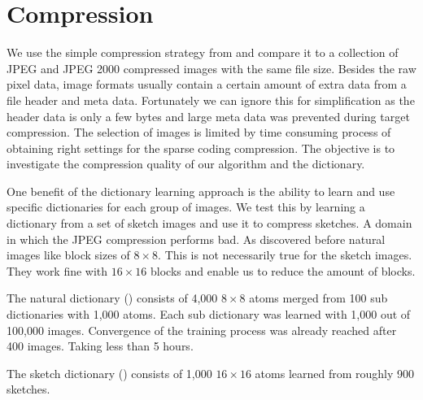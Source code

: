 
\clearpage
\section{Compression}
We use the simple compression strategy from 
and compare it to a collection of JPEG and JPEG 2000 compressed images with the
same file size. Besides the raw pixel data, image formats usually contain a
certain amount of extra data from a file header and meta data. Fortunately we
can ignore this for simplification as the header data is only a few bytes and
large meta data was prevented during target compression. The selection of
images is limited by time consuming process of obtaining right settings
for the sparse coding compression. 
The objective is to investigate the compression quality of our algorithm and
the dictionary. 

One benefit of the dictionary learning approach is the ability to learn and
use specific dictionaries for each group of images. We test this by learning a
dictionary from a set of sketch images and use it to compress sketches. A domain
in which the JPEG compression performs bad. As discovered before natural
images like block sizes of $8\times 8$. This is not necessarily true for the
sketch images. They work fine with $16\times 16$ blocks and enable us to reduce
the amount of blocks.

The natural dictionary () consists of 4,000 $8 \times
8$ atoms merged from 100 sub dictionaries with 1,000 atoms. Each sub
dictionary was learned with 1,000 out of 100,000 images. Convergence of the
training process was already reached after 400 images. Taking less than 5
hours.

The sketch dictionary () consists of 1,000
$16\times 16$ atoms learned from roughly 900 sketches.

